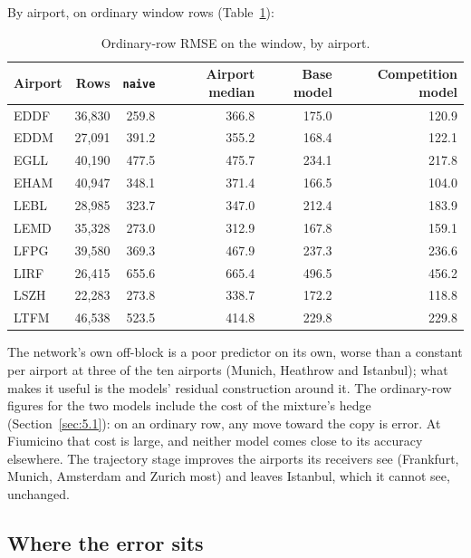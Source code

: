 \documentclass[
  manuscript=article,
  layout=preprint,
  year=2026,
  volume=x,
]{extra/joas}
\begin{document}
By airport, on ordinary window rows (Table~\ref{tab:13}):

\begin{table}[htbp!]
  \centering
  \small
  \setlength{\tabcolsep}{5pt}\renewcommand{\arraystretch}{1.15}
  \caption{Ordinary-row RMSE on the window, by airport.}
  \label{tab:13}
  \begin{tabular*}{\linewidth}{@{\extracolsep{\fill}}lrrrrr}
  \toprule
  \textbf{Airport} & \textbf{Rows} & \textbf{\texttt{naive}} & \textbf{Airport median} & \textbf{Base model} & \textbf{Competition model} \\
  \midrule
  EDDF & 36,830 & 259.8 & 366.8 & 175.0 & 120.9 \\
  EDDM & 27,091 & 391.2 & 355.2 & 168.4 & 122.1 \\
  EGLL & 40,190 & 477.5 & 475.7 & 234.1 & 217.8 \\
  EHAM & 40,947 & 348.1 & 371.4 & 166.5 & 104.0 \\
  LEBL & 28,985 & 323.7 & 347.0 & 212.4 & 183.9 \\
  LEMD & 35,328 & 273.0 & 312.9 & 167.8 & 159.1 \\
  LFPG & 39,580 & 369.3 & 467.9 & 237.3 & 236.6 \\
  LIRF & 26,415 & 655.6 & 665.4 & 496.5 & 456.2 \\
  LSZH & 22,283 & 273.8 & 338.7 & 172.2 & 118.8 \\
  LTFM & 46,538 & 523.5 & 414.8 & 229.8 & 229.8 \\
  \bottomrule
  \end{tabular*}
\end{table}

The network's own off-block is a poor predictor on its own, worse than a constant per airport at three of the ten airports (Munich, Heathrow and Istanbul); what makes it useful is the models' residual construction around it. The ordinary-row figures for the two models include the cost of the mixture's hedge (Section~\ref{sec:5.1}): on an ordinary row, any move toward the copy is error. At Fiumicino that cost is large, and neither model comes close to its accuracy elsewhere. The trajectory stage improves the airports its receivers see (Frankfurt, Munich, Amsterdam and Zurich most) and leaves Istanbul, which it cannot see, unchanged.

\subsection{Where the error sits}\label{sec:6.2}
\end{document}

